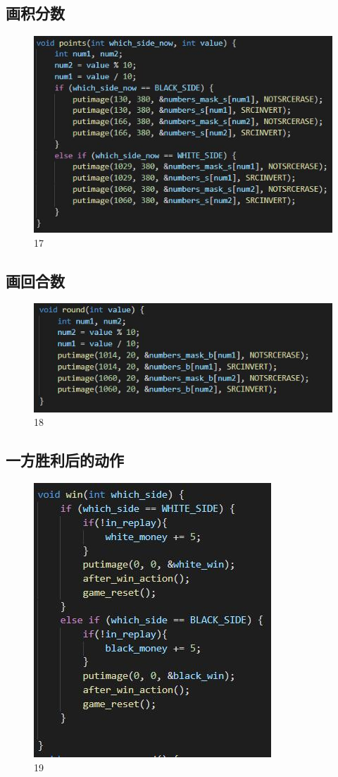 \documentclass[UTF8]{ctexart}
\begin{document}
\subsection{画积分数}
\begin{figure}[H]
    \centering
    \includegraphics[scale=1.0]{16.jpg}
\caption{17}
\end{figure}
\subsection{画回合数}
\begin{figure}[H]
    \centering
    \includegraphics[scale=1.0]{17.jpg}
\caption{18}
\end{figure}
\subsection{一方胜利后的动作}
\begin{figure}[H]
    \centering
    \includegraphics[scale=1.0]{18.jpg}
\caption{19}
\end{figure}
\end{document}
